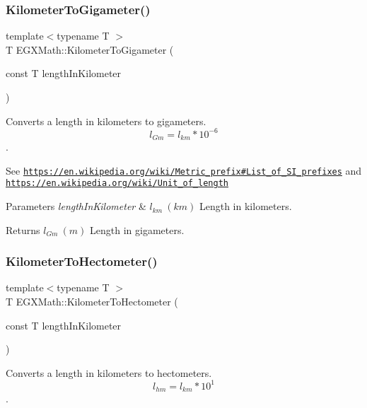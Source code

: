 \subsubsection{\texorpdfstring{Kilometer\+To\+Gigameter()}{KilometerToGigameter()}}
{\footnotesize\ttfamily template$<$typename T $>$ \\
T E\+G\+X\+Math\+::\+Kilometer\+To\+Gigameter (\begin{DoxyParamCaption}\item[{const T}]{length\+In\+Kilometer }\end{DoxyParamCaption})}



Converts a length in kilometers to gigameters. \[ l_{Gm}=l_{km} * 10^{-6} \]. 

See \href{https://en.wikipedia.org/wiki/Metric_prefix#List_of_SI_prefixes}{\tt https\+://en.\+wikipedia.\+org/wiki/\+Metric\+\_\+prefix\#\+List\+\_\+of\+\_\+\+S\+I\+\_\+prefixes} and \href{https://en.wikipedia.org/wiki/Unit_of_length}{\tt https\+://en.\+wikipedia.\+org/wiki/\+Unit\+\_\+of\+\_\+length} 
\begin{DoxyParams}{Parameters}
{\em length\+In\+Kilometer} & $ l_{km}\ (km)$ Length in kilometers. \\
\hline
\end{DoxyParams}
\begin{DoxyReturn}{Returns}
$ l_{Gm}\ (m)$ Length in gigameters. 
\end{DoxyReturn}
\mbox{\label{group___e_g_x_math-_conversions-_length_conversions-_s_i-_kilometer-_s_i_ga43aeeda4346af2ec10e749d076d38bc3}} 
\subsubsection{\texorpdfstring{Kilometer\+To\+Hectometer()}{KilometerToHectometer()}}
{\footnotesize\ttfamily template$<$typename T $>$ \\
T E\+G\+X\+Math\+::\+Kilometer\+To\+Hectometer (\begin{DoxyParamCaption}\item[{const T}]{length\+In\+Kilometer }\end{DoxyParamCaption})}



Converts a length in kilometers to hectometers. \[ l_{hm}=l_{km} * 10^{1} \]. 

